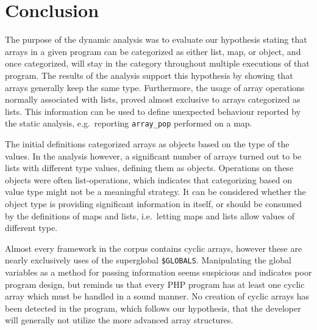 \section{Conclusion}
\label{sec:studyConclusion}
The purpose of the dynamic analysis was to evaluate our hypothesis stating that arrays in a given program can be categorized as either list, map, or object, and once categorized, will stay in the category throughout multiple executions of that program. The results of the analysis support this hypothesis by showing that arrays generally keep the same type. Furthermore, the usage of array operations normally associated with lists, proved almost exclusive to arrays categorized as lists. This information can be used to define unexpected behaviour reported by the static analysis, e.g.\ reporting \texttt{array\_pop} performed on a map. 

The initial definitions categorized arrays as objects based on the type of the values. In the analysis however, a significant number of arrays turned out to be lists with different type values, defining them as objects. Operations on these objects were often list-operations, which indicates that categorizing based on value type might not be a meaningful strategy. It can be considered whether the object type is providing significant information in itself, or should be consumed by the definitions of maps and lists, i.e.\ letting maps and lists allow values of different type.

Almost every framework in the corpus contains cyclic arrays, however these are nearly exclusively uses of the superglobal \texttt{\$GLOBALS}. Manipulating the global variables as a method for passing information seems suspicious and indicates poor program design, but reminds us that every PHP program has at least one cyclic array which must be handled in a sound manner. No creation of cyclic arrays has been detected in the program, which follows our hypothesis, that the developer will generally not utilize the more advanced array structures. 